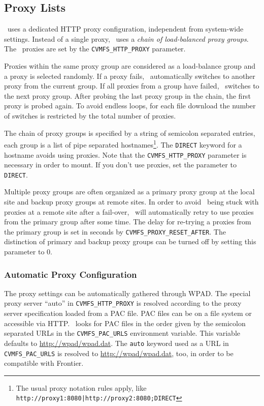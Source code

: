 \subsection{Proxy Lists}
\cvmfs\ uses a dedicated HTTP proxy configuration, independent from system-wide settings. 
Instead of a single proxy, \cvmfs\ uses a \emph{chain of load-balanced proxy groups}.
The \cvmfs\ proxies are set by the \texttt{CVMFS\_HTTP\_PROXY} parameter.

Proxies within the same proxy group are considered as a load-balance group and a proxy is selected randomly.
If a proxy fails, \cvmfs\ automatically switches to another proxy from the current group.
If all proxies from a group have failed, \cvmfs\ switches to the next proxy group.
After probing the last proxy group in the chain, the first proxy is probed again.
To avoid endless loops, for each file download the number of switches is restricted by the total number of proxies.

The chain of proxy groups is specified by a string of semicolon separated entries, each group is a list of pipe separated hostnames\footnote{The usual proxy notation rules apply, like \texttt{http://proxy1:8080|http://proxy2:8080;DIRECT}}.
The \texttt{DIRECT} keyword for a hostname avoids using proxies.
Note that the \texttt{CVMFS\_HTTP\_PROXY} parameter is necessary in order to mount.
If you don't use proxies, set the parameter to \texttt{DIRECT}.

Multiple proxy groups are often organized as a primary proxy group at the local site and backup proxy groups at remote sites.
In order to avoid \cvmfs\ being stuck with proxies at a remote site after a fail-over, \cvmfs\ will automatically retry to use proxies from the primary group after some time.
The delay for re-trying a proxies from the primary group is set in seconds by \texttt{CVMFS\_PROXY\_RESET\_AFTER}.
The distinction of primary and backup proxy groups can be turned off by setting this parameter to 0.

\subsubsection{Automatic Proxy Configuration}
The proxy settings can be automatically gathered through WPAD.
The special proxy server ``auto'' in \texttt{CVMFS\_HTTP\_PROXY} is resolved according to the proxy server specification loaded from a PAC file.
PAC files can be on a file system or accessible via HTTP.
\cvmfs\ looks for PAC files in the order given by the semicolon separated URLs in the \texttt{CVMFS\_PAC\_URLS} environment variable.
This variable defaults to \url{http://wpad/wpad.dat}.
The \texttt{auto} keyword used as a URL in \texttt{CVMFS\_PAC\_URLS} is resolved to \url{http://wpad/wpad.dat}, too, in order to be compatible with Frontier.

